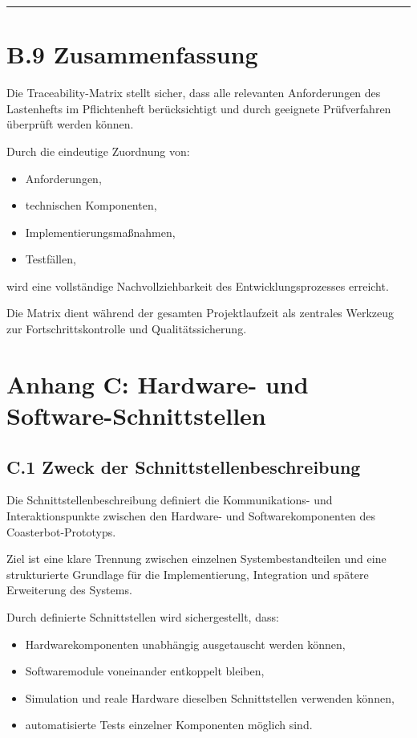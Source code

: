 \documentclass[
  a4paper,
  12pt,
  DIV=12,        %
  parskip=half,  %
  headings=small %
]{scrartcl}
\theoremstyle{definition}
\providecommand{\tightlist}{%
  \setlength{\itemsep}{0pt}\setlength{\parskip}{0pt}}
\theoremstyle{definition}
\providecommand{\tightlist}{%
  \setlength{\itemsep}{0pt}\setlength{\parskip}{0pt}}
\begin{document}
\begin{center}\rule{0.5\linewidth}{0.5pt}\end{center}

\section{B.9 Zusammenfassung}\label{b.9-zusammenfassung}

Die Traceability-Matrix stellt sicher, dass alle relevanten
Anforderungen des Lastenhefts im Pflichtenheft berücksichtigt und durch
geeignete Prüfverfahren überprüft werden können.

Durch die eindeutige Zuordnung von:

\begin{itemize}
\tightlist
\item
  Anforderungen,
\item
  technischen Komponenten,
\item
  Implementierungsmaßnahmen,
\item
  Testfällen,
\end{itemize}

wird eine vollständige Nachvollziehbarkeit des Entwicklungsprozesses
erreicht.

Die Matrix dient während der gesamten Projektlaufzeit als zentrales
Werkzeug zur Fortschrittskontrolle und Qualitätssicherung.

\section{Anhang C: Hardware- und
Software-Schnittstellen}\label{anhang-c-hardware--und-software-schnittstellen}

\subsection{C.1 Zweck der
Schnittstellenbeschreibung}\label{c.1-zweck-der-schnittstellenbeschreibung}

Die Schnittstellenbeschreibung definiert die Kommunikations- und
Interaktionspunkte zwischen den Hardware- und Softwarekomponenten des
Coasterbot-Prototyps.

Ziel ist eine klare Trennung zwischen einzelnen Systembestandteilen und
eine strukturierte Grundlage für die Implementierung, Integration und
spätere Erweiterung des Systems.

Durch definierte Schnittstellen wird sichergestellt, dass:

\begin{itemize}
\tightlist
\item
  Hardwarekomponenten unabhängig ausgetauscht werden können,
\item
  Softwaremodule voneinander entkoppelt bleiben,
\item
  Simulation und reale Hardware dieselben Schnittstellen verwenden
  können,
\item
  automatisierte Tests einzelner Komponenten möglich sind.
\end{itemize}
\end{document}
